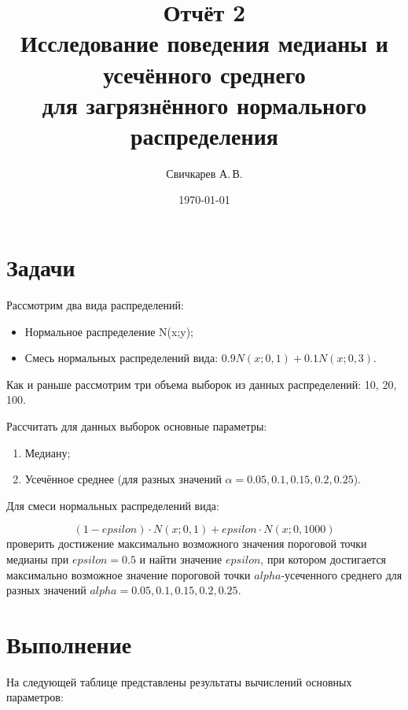 \documentclass{article} %
\title{Отчёт 2\\
Исследование поведения медианы и усечённого среднего\\
для загрязнённого нормального распределения} %
\author{Свичкарев А.\,В.} %
\date{\today} %
\begin{document}

\maketitle %

\section*{Задачи}
Рассмотрим два вида распределений:
\begin{itemize}
    \item Нормальное распределение N(x;y);
    \item Смесь нормальных распределений вида: $0.9 N(x;0,1) + 0.1 N(x;0,3)$.
\end{itemize}

Как и раньше рассмотрим три объема выборок из данных распределений:
10, 20, 100. 
\bigskip

Рассчитать для данных выборок основные параметры:
\begin{enumerate}
    \item Медиану;
    \item Усечённое среднее
        (для разных значений $\alpha = 0.05, 0.1, 0.15, 0.2, 0.25$).
\end{enumerate}

Для смеси нормальных распределений вида:

\begin{equation*}
(1-epsilon) \cdot N(x;0,1) + epsilon \cdot N(x;0,1000)
\end{equation*}
проверить достижение максимально возможного значения
пороговой точки медианы при $epsilon = 0.5$
и найти значение $epsilon$,
при котором достигается максимально возможное значение
пороговой точки $alpha$-усеченного среднего
для разных значений
$alpha = 0.05, 0.1, 0.15, 0.2, 0.25$.

\section*{Выполнение}

На следующей таблице представлены результаты вычислений
основных параметров:
\end{document}
